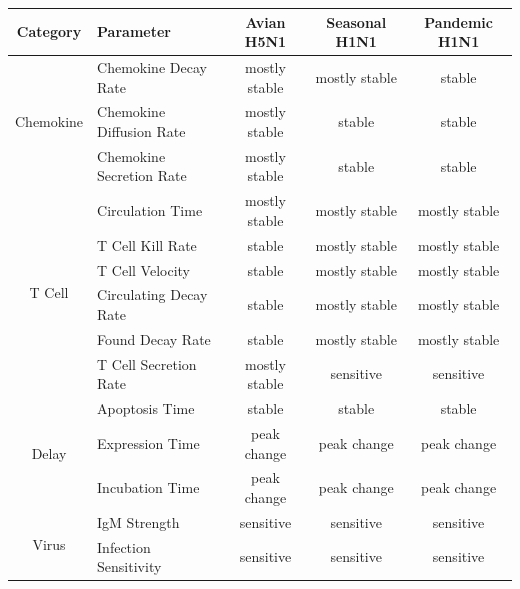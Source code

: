 \documentclass[10pt]{article}
\begin{document}
\begin{table}
\begin{center}
\begin{tabular}{| c | l | c c c |}
  \hline                        
  Category & Parameter & Avian H5N1 & Seasonal H1N1 & Pandemic H1N1 \\
  \hline
  \multirow{3}{*}{Chemokine} & Chemokine Decay Rate & \cellcolor{blue!30}mostly stable & \cellcolor{blue!30}mostly stable & \cellcolor{green!50}stable \\
  & Chemokine Diffusion Rate & \cellcolor{blue!30}mostly stable & \cellcolor{green!50}stable& \cellcolor{green!50}stable \\
  & Chemokine Secretion Rate & \cellcolor{blue!30}mostly stable & \cellcolor{green!50}stable & \cellcolor{green!50}stable \\
  \hline
  \multirow{6}{*}{T Cell} & Circulation Time & \cellcolor{blue!30}mostly stable & \cellcolor{blue!30}mostly stable & \cellcolor{blue!30}mostly stable \\
  & T Cell Kill Rate & \cellcolor{green!50}stable & \cellcolor{blue!30}mostly stable & \cellcolor{blue!30}mostly stable \\
  & T Cell Velocity & \cellcolor{green!50}stable & \cellcolor{blue!30}mostly stable & \cellcolor{blue!30}mostly stable \\
  & Circulating Decay Rate & \cellcolor{green!50}stable & \cellcolor{blue!30}mostly stable& \cellcolor{blue!30}mostly stable \\
  & Found Decay Rate & \cellcolor{green!50}stable & \cellcolor{blue!30}mostly stable & \cellcolor{blue!30}mostly stable \\
  & T Cell Secretion Rate & \cellcolor{blue!30}mostly stable & \cellcolor{red!40}sensitive & \cellcolor{red!40}sensitive \\
  \hline
  \multirow{3}{*}{Delay} & Apoptosis Time & \cellcolor{green!50}stable & \cellcolor{green!50}stable & \cellcolor{green!50}stable \\
  & Expression Time & \cellcolor{yellow!50}peak change & \cellcolor{yellow!50}peak change & \cellcolor{yellow!50}peak change \\
  & Incubation Time &  \cellcolor{yellow!50}peak change & \cellcolor{yellow!50}peak change & \cellcolor{yellow!50}peak change \\
  \hline 
  \multirow{4}{*}{Virus} & IgM Strength & \cellcolor{red!40}sensitive & \cellcolor{red!40}sensitive & \cellcolor{red!40}sensitive \\
  & Infection Sensitivity & \cellcolor{red!40}sensitive & \cellcolor{red!40}sensitive & \cellcolor{red!40}sensitive \\

\end{tabular}
\end{center}
\end{table}
\end{document}
